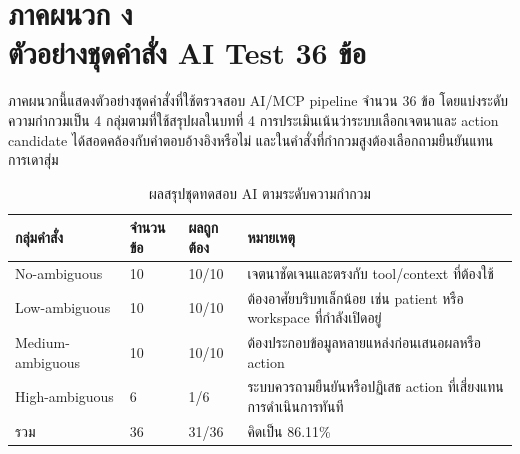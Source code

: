 \chapter[ตัวอย่างชุดคำสั่ง AI Test]{\texorpdfstring{ภาคผนวก ง\\ตัวอย่างชุดคำสั่ง AI Test 36 ข้อ}{Appendix D: AI Test Set}}
\label{app:ai_test_set}

ภาคผนวกนี้แสดงตัวอย่างชุดคำสั่งที่ใช้ตรวจสอบ AI/MCP pipeline จำนวน 36 ข้อ โดยแบ่งระดับความกำกวมเป็น 4 กลุ่มตามที่ใช้สรุปผลในบทที่ 4 การประเมินเน้นว่าระบบเลือกเจตนาและ action candidate ได้สอดคล้องกับคำตอบอ้างอิงหรือไม่ และในคำสั่งที่กำกวมสูงต้องเลือกถามยืนยันแทนการเดาสุ่ม

\begin{table}[H]
    \centering
    \caption{ผลสรุปชุดทดสอบ AI ตามระดับความกำกวม}
    \label{tab:app_ai_irr_summary}
    \renewcommand{\arraystretch}{1.18}
    \small
    \setlength{\tabcolsep}{3pt}
    \begin{tabular}{|L{0.26\textwidth}|L{0.17\textwidth}|L{0.17\textwidth}|L{0.28\textwidth}|}
        \hline
        \textbf{กลุ่มคำสั่ง} & \textbf{จำนวนข้อ} & \textbf{ผลถูกต้อง} & \textbf{หมายเหตุ} \\ \hline
        No-ambiguous & 10 & 10/10 & เจตนาชัดเจนและตรงกับ tool/context ที่ต้องใช้ \\ \hline
        Low-ambiguous & 10 & 10/10 & ต้องอาศัยบริบทเล็กน้อย เช่น patient หรือ workspace ที่กำลังเปิดอยู่ \\ \hline
        Medium-ambiguous & 10 & 10/10 & ต้องประกอบข้อมูลหลายแหล่งก่อนเสนอผลหรือ action \\ \hline
        High-ambiguous & 6 & 1/6 & ระบบควรถามยืนยันหรือปฏิเสธ action ที่เสี่ยงแทนการดำเนินการทันที \\ \hline
        รวม & 36 & 31/36 & คิดเป็น 86.11\% \\ \hline
    \end{tabular}
\end{table}

